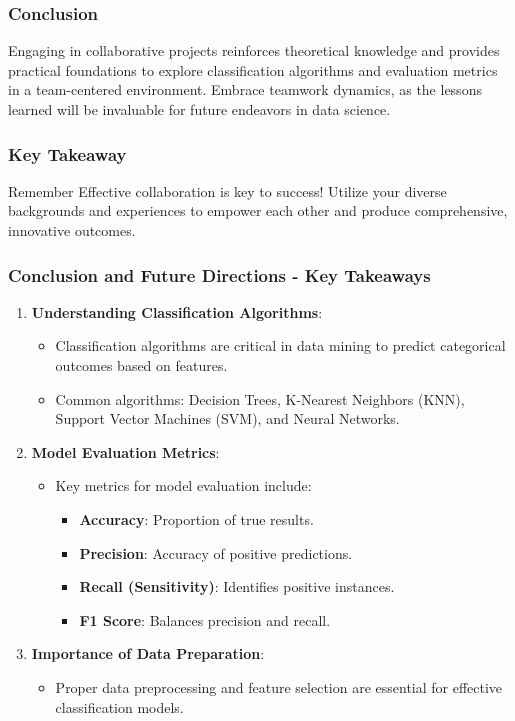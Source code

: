 \documentclass[aspectratio=169]{beamer}
\begin{document}
\begin{frame}[fragile]
    \frametitle{Conclusion}
    Engaging in collaborative projects reinforces theoretical knowledge and provides practical foundations to explore classification algorithms and evaluation metrics in a team-centered environment. Embrace teamwork dynamics, as the lessons learned will be invaluable for future endeavors in data science.
\end{frame}

\begin{frame}[fragile]
    \frametitle{Key Takeaway}
    \begin{block}{Remember}
        Effective collaboration is key to success! Utilize your diverse backgrounds and experiences to empower each other and produce comprehensive, innovative outcomes.
    \end{block}
\end{frame}

\begin{frame}[fragile]
    \frametitle{Conclusion and Future Directions - Key Takeaways}
    \begin{enumerate}
        \item \textbf{Understanding Classification Algorithms}:
        \begin{itemize}
            \item Classification algorithms are critical in data mining to predict categorical outcomes based on features.
            \item Common algorithms: Decision Trees, K-Nearest Neighbors (KNN), Support Vector Machines (SVM), and Neural Networks.
        \end{itemize}
        
        \item \textbf{Model Evaluation Metrics}:
        \begin{itemize}
            \item Key metrics for model evaluation include:
            \begin{itemize}
                \item \textbf{Accuracy}: Proportion of true results.
                \item \textbf{Precision}: Accuracy of positive predictions.
                \item \textbf{Recall (Sensitivity)}: Identifies positive instances.
                \item \textbf{F1 Score}: Balances precision and recall.
            \end{itemize}
        \end{itemize}

        \item \textbf{Importance of Data Preparation}:
        \begin{itemize}
            \item Proper data preprocessing and feature selection are essential for effective classification models.
        \end{itemize}
    \end{enumerate}
\end{frame}
\end{document}
